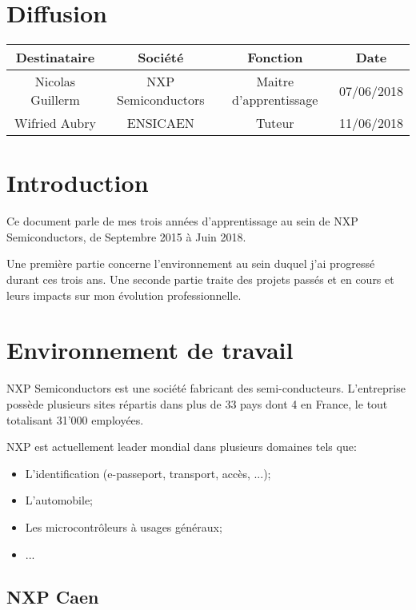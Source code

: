 \documentclass[french,12pt,a4paper,titlepage,openright,openbib]{report}
\begin{document}
{\let \clearpage \relax \chapter*{Diffusion}}
\begin{table}[ht]
	\label{tab:diffusion}
	\centering
	\begin{tabular}{|c|c|c|c|}
		\hline
		{\bf Destinataire} & {\bf Société}      & {\bf Fonction}   		 & {\bf Date}\\
		\hline
		Nicolas Guillerm   & NXP Semiconductors & Maitre d'apprentissage & 07/06/2018 \\
		\hline
		Wifried Aubry      & ENSICAEN 			& Tuteur				 & 11/06/2018 \\
		\hline
	\end{tabular}
\end{table}

\chapter{Introduction}
Ce document parle de mes trois années d'apprentissage au sein de NXP Semiconductors, de Septembre 2015 à Juin 2018.

Une première partie concerne l'environnement au sein duquel j'ai progressé durant ces trois ans.
Une seconde partie traite des projets passés et en cours et leurs impacts sur mon évolution professionnelle.

\chapter{Environnement de travail}
NXP Semiconductors est une société fabricant des semi-conducteurs.
L'entreprise possède plusieurs sites répartis dans plus de 33 pays dont 4 en France, le tout totalisant 31'000 employé\textperiodcentered e\textperiodcentered s.

NXP est actuellement leader mondial dans plusieurs domaines tels que:

\begin{itemize}
\item L'identification (e-passeport, transport, accès, ...);
\item L'automobile;
\item Les microcontrôleurs à usages généraux;
\item ...
\end{itemize}

\section{NXP Caen}
\end{document}
